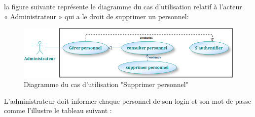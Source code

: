 \documentclass[12 pt]{report}
\begin{document}
la figure suivante représente le diagramme du cas d’utilisation  relatif à l’acteur \\« Administrateur » qui a le droit de supprimer un personnel:
\begin{figure}[h]
 \begin{center}
\includegraphics[width=12 cm ,height= 4 cm]{a5.PNG}
\caption{Diagramme du cas d’utilisation "Supprimer personnel"}
\end{center}
\end{figure}
\newpage
L’administrateur doit informer chaque personnel de son login et son mot de passe comme l'illustre le tableau suivant :
\end{document}
